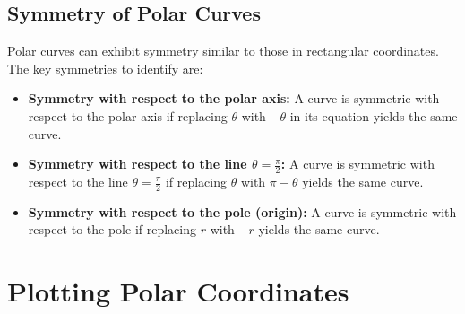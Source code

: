 \documentclass{article}
\begin{document}
\subsection*{Symmetry of Polar Curves}
\begin{theorembox}
    Polar curves can exhibit symmetry similar to those in rectangular coordinates. The key symmetries to identify are:
    \begin{itemize}
        \item \textbf{Symmetry with respect to the polar axis:} A curve is symmetric with respect to the polar axis if replacing \( \theta \) with \( -\theta \) in its equation yields the same curve.
        \item \textbf{Symmetry with respect to the line \( \theta = \frac{\pi}{2} \):} A curve is symmetric with respect to the line \( \theta = \frac{\pi}{2} \) if replacing \( \theta \) with \( \pi - \theta \) yields the same curve.
        \item \textbf{Symmetry with respect to the pole (origin):} A curve is symmetric with respect to the pole if replacing \( r \) with \( -r \) yields the same curve.
    \end{itemize}
\end{theorembox}


\setcounter{page}{2}
\normalsize

\section*{Plotting Polar Coordinates}
\end{document}
